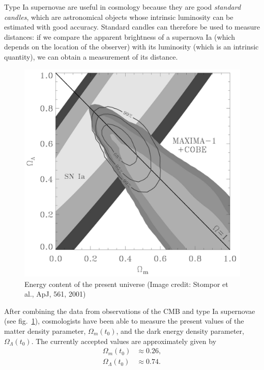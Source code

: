 Type Ia supernovae are useful in cosmology because they are good {\it standard candles}, which are astronomical objects whose intrinsic luminosity can be estimated with good accuracy. Standard candles can therefore be used to measure distances: if we compare the apparent brightness of a supernova Ia (which depends on the location of the observer) with its luminosity (which is an intrinsic quantity), we can obtain a measurement of its distance.
\begin{figure}[ht]
\begin{center}
\includegraphics[scale=0.25]{Draw/lec10_2.png}
\end{center}
\caption{Energy content of the present universe (Image credit: Stompor et al., ApJ, 561, 2001)}
\label{fig:lec10_2}
\end{figure}

After combining the data from observations of the CMB and type Ia supernovae (see fig.\ \ref{fig:lec10_2}), cosmologists have been able to measure the present values of the matter density parameter, $\Omega_m(t_0)$, and the dark energy density parameter, $\Omega_{\Lambda}(t_0)$. The currently accepted values are approximately given by
\begin{equation}
\begin{split}
\Omega_m(t_0)&\approx 0.26,\\
\Omega_{\Lambda}(t_0)&\approx 0.74.
\end{split}
\end{equation}

